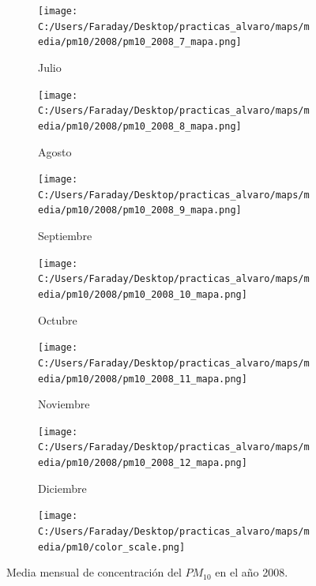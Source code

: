 \documentclass[12pt]{article}
\begin{document}
\begin{figure}[H]
\begin{subfigure}[H]{0.15\textwidth}
\texttt{[image: C:/Users/Faraday/Desktop/practicas\_alvaro/maps/media/pm10/2008/pm10\_2008\_7\_mapa.png]}
\captionsetup{labelformat=empty}
\caption{Julio}
\label{fig:map-pm10-2008-7}
\end{subfigure}
%
\begin{subfigure}[H]{0.15\textwidth}
\texttt{[image: C:/Users/Faraday/Desktop/practicas\_alvaro/maps/media/pm10/2008/pm10\_2008\_8\_mapa.png]}
\captionsetup{labelformat=empty}
\caption{Agosto}
\label{fig:map-pm10-2008-8}
\end{subfigure}
%
\begin{subfigure}[H]{0.15\textwidth}
\texttt{[image: C:/Users/Faraday/Desktop/practicas\_alvaro/maps/media/pm10/2008/pm10\_2008\_9\_mapa.png]}
\captionsetup{labelformat=empty}
\caption{Septiembre}
\label{fig:map-pm10-2008-9}
\end{subfigure}
%
\begin{subfigure}[H]{0.15\textwidth}
\texttt{[image: C:/Users/Faraday/Desktop/practicas\_alvaro/maps/media/pm10/2008/pm10\_2008\_10\_mapa.png]}
\captionsetup{labelformat=empty}
\caption{Octubre}
\label{fig:map-pm10-2008-10}
\end{subfigure}
%
\begin{subfigure}[H]{0.15\textwidth}
\texttt{[image: C:/Users/Faraday/Desktop/practicas\_alvaro/maps/media/pm10/2008/pm10\_2008\_11\_mapa.png]}
\captionsetup{labelformat=empty}
\caption{Noviembre}
\label{fig:map-pm10-2008-11}
\end{subfigure}
%
\begin{subfigure}[H]{0.15\textwidth}
\texttt{[image: C:/Users/Faraday/Desktop/practicas\_alvaro/maps/media/pm10/2008/pm10\_2008\_12\_mapa.png]}
\captionsetup{labelformat=empty}
\caption{Diciembre}
\label{fig:map-pm10-2008-12}
\end{subfigure}

\begin{subfigure}[H]{0.45\textwidth}
\texttt{[image: C:/Users/Faraday/Desktop/practicas\_alvaro/maps/media/pm10/color\_scale.png]}
\captionsetup{labelformat=empty}
\caption{}
\end{subfigure}

\vspace*{-7mm}
\caption{Media mensual de concentración del $PM_{10}$ en el año 2008.}
\label{fig:map-pm10-2008}
\end{figure}
\end{document}
